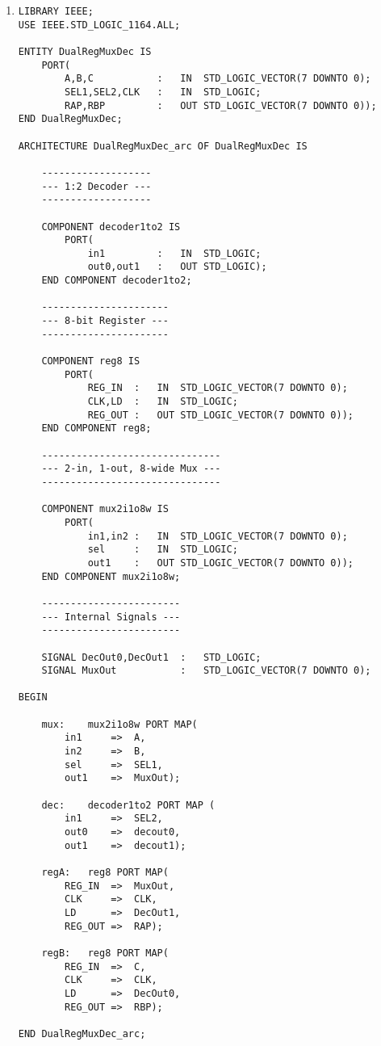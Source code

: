 \begin{enumerate}
\begin{lstlisting}
	regA:	reg8 PORT MAP(
		REG_IN	=>	A,
		CLK		=>	CLK,
		LD		=>	DecOut1,
		REG_OUT	=>	RAX);

	regB:	reg8 PORT MAP(
		REG_IN	=>	MuxOut,
		CLK		=>	CLK,
		LD		=>	DecOut0,
		REG_OUT	=>	RBX);

END DualRegDecMux_arc;
	\end{lstlisting}

	\item \begin{lstlisting}
LIBRARY IEEE;
USE IEEE.STD_LOGIC_1164.ALL;

ENTITY DualRegMuxDec IS
	PORT(
		A,B,C			:	IN	STD_LOGIC_VECTOR(7 DOWNTO 0);
		SEL1,SEL2,CLK	:	IN	STD_LOGIC;
		RAP,RBP			:	OUT	STD_LOGIC_VECTOR(7 DOWNTO 0));
END DualRegMuxDec;

ARCHITECTURE DualRegMuxDec_arc OF DualRegMuxDec IS

	-------------------
	--- 1:2 Decoder ---
	-------------------

	COMPONENT decoder1to2 IS
		PORT(
			in1			:	IN	STD_LOGIC;
			out0,out1	:	OUT	STD_LOGIC);
	END COMPONENT decoder1to2;

	----------------------
	--- 8-bit Register ---
	----------------------

	COMPONENT reg8 IS
		PORT(
			REG_IN	:	IN	STD_LOGIC_VECTOR(7 DOWNTO 0);
			CLK,LD	:	IN	STD_LOGIC;
			REG_OUT	:	OUT	STD_LOGIC_VECTOR(7 DOWNTO 0));
	END COMPONENT reg8;

	-------------------------------
	--- 2-in, 1-out, 8-wide Mux ---
	-------------------------------

	COMPONENT mux2i1o8w IS
		PORT(
			in1,in2	:	IN	STD_LOGIC_VECTOR(7 DOWNTO 0);
			sel		:	IN	STD_LOGIC;
			out1	:	OUT	STD_LOGIC_VECTOR(7 DOWNTO 0));
	END COMPONENT mux2i1o8w;

	------------------------
	--- Internal Signals ---
	------------------------

	SIGNAL DecOut0,DecOut1	:	STD_LOGIC;
	SIGNAL MuxOut			:	STD_LOGIC_VECTOR(7 DOWNTO 0);

BEGIN

	mux:	mux2i1o8w PORT MAP(
		in1		=>	A,
		in2		=>	B,
		sel		=>	SEL1,
		out1	=>	MuxOut);

	dec:	decoder1to2 PORT MAP (
		in1		=>	SEL2,
		out0	=>	decout0,
		out1	=>	decout1);

	regA:	reg8 PORT MAP(
		REG_IN	=>	MuxOut,
		CLK		=>	CLK,
		LD		=>	DecOut1,
		REG_OUT	=>	RAP);

	regB:	reg8 PORT MAP(
		REG_IN	=>	C,
		CLK		=>	CLK,
		LD		=>	DecOut0,
		REG_OUT	=>	RBP);

END DualRegMuxDec_arc;
	\end{lstlisting}
\end{enumerate}
\resumetocwriting
